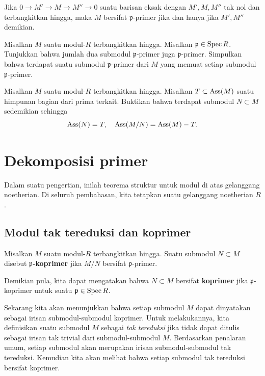 \begin{exercise} 
Jika $0 \to M' \to M \to M'' \to 0$ suatu barisan eksak dengan $M', M, M''$
tak nol dan terbangkitkan hingga, maka $M$ bersifat $\mathfrak{p}$-primer jika dan hanya jika $M', M''$ demikian.
\end{exercise} 

\begin{exercise} 
Misalkan $M$ suatu modul-$R$ terbangkitkan hingga. Misalkan $\mathfrak{p} \in \operatorname{Spec} R$. Tunjukkan bahwa jumlah dua
submodul $\mathfrak{p}$-primer juga $\mathfrak{p}$-primer. Simpulkan bahwa
terdapat suatu submodul $\mathfrak{p}$-primer dari $M$ yang memuat setiap
submodul $\mathfrak{p}$-primer. 
\end{exercise} 

\begin{exercise}[Bourbaki]
Misalkan $M$ suatu modul-$R$ terbangkitkan hingga. Misalkan $T \subset \operatorname{Ass}(M)$ suatu
himpunan bagian dari prima terkait. Buktikan bahwa terdapat submodul $N \subset M$
sedemikian sehingga 
\[ \operatorname{Ass}(N) = T, \quad \operatorname{Ass}(M/N) = \operatorname{Ass}(M) - T.  \]

\end{exercise} 

\section{Dekomposisi primer} Dalam suatu pengertian, inilah teorema struktur untuk modul
di atas gelanggang noetherian.
Di seluruh pembahasan, kita tetapkan suatu gelanggang noetherian $R$.

\subsection{Modul tak tereduksi dan koprimer}

\begin{definition} 
Misalkan $M$ suatu modul-$R$ terbangkitkan hingga. Suatu submodul $N \subset M$ disebut
\textbf{$\mathfrak{p}$-koprimer} jika $M/N$ bersifat $\mathfrak{p}$-primer.

Demikian pula, kita dapat mengatakan bahwa $N \subset M$ bersifat \textbf{koprimer} jika
$\mathfrak{p}$-koprimer untuk suatu $\mathfrak{p} \in \operatorname{Spec} R$.
\end{definition} 

Sekarang kita akan menunjukkan bahwa setiap submodul $M$ dapat dinyatakan sebagai irisan
submodul-submodul koprimer. Untuk melakukannya, kita definisikan suatu submodul $M$ sebagai
\emph{tak tereduksi} jika tidak dapat ditulis sebagai irisan tak trivial dari
submodul-submodul $M$. Berdasarkan penalaran umum,
setiap submodul akan merupakan irisan submodul-submodul
tak tereduksi. Kemudian kita akan melihat bahwa setiap submodul tak tereduksi bersifat
koprimer. 

